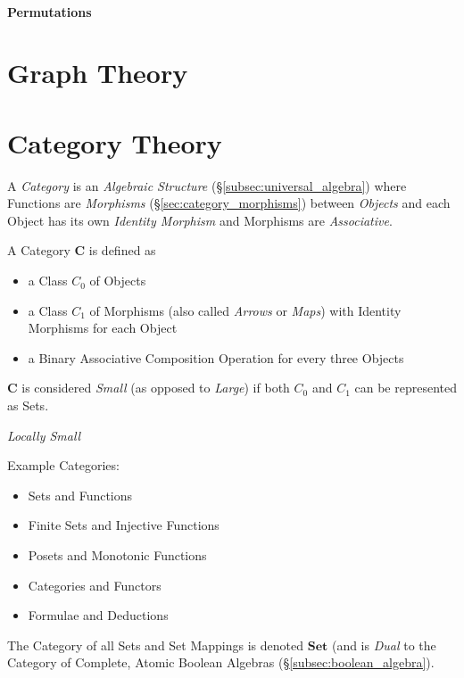 \documentclass{article}
\begin{document}
\subsection{Permutations}\label{subsec:permutations}

\part{Graph Theory}

\part{Category Theory}\label{sec:category_theory}\cite{awodey06}

A \emph{Category} is an \emph{Algebraic Structure}
(\S\ref{subsec:universal_algebra}) where Functions are
\emph{Morphisms} (\S\ref{sec:category_morphisms}) between
\emph{Objects} and each Object has its own \emph{Identity Morphism}
and Morphisms are \emph{Associative}.

A Category $\mathbf{C}$ is defined as
\begin{itemize}
\item a Class $C_0$ of Objects
\item a Class $C_1$ of Morphisms (also called \emph{Arrows} or
  \emph{Maps}) with Identity Morphisms for each Object
\item a Binary Associative Composition Operation for every three
  Objects
\end{itemize}
$\mathbf{C}$ is considered \emph{Small} (as opposed to \emph{Large})
if both $C_0$ and $C_1$ can be represented as Sets.

\emph{Locally Small}

Example Categories:
\begin{itemize}
\item Sets and Functions
\item Finite Sets and Injective Functions
\item Posets and Monotonic Functions
\item Categories and Functors
\item Formulae and Deductions
\end{itemize}
The Category of all Sets and Set Mappings is denoted $\mathbf{Set}$
(and is \emph{Dual} to the Category of Complete, Atomic Boolean
Algebras (\S\ref{subsec:boolean_algebra}).
\end{document}
